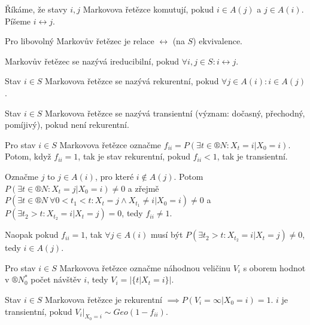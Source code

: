 \documentclass[12pt]{article}					%
\begin{document}
\begin{definice}
	Říkáme, že stavy $i, j$ Markovova řetězce komutují, pokud $i \in A(j)$ a $j \in A(i)$. Píšeme $i \leftrightarrow j$.
\end{definice}

\begin{veta}
	Pro libovolný Markovův řetězec je relace $\leftrightarrow$ (na $S$) ekvivalence.
\end{veta}

\begin{definice}
	Markovův řetězec se nazývá ireducibilní, pokud $\forall i, j \in S: i \leftrightarrow j$.
\end{definice}

\begin{definice}
	Stav $i \in S$ Markovova řetězce se nazývá rekurentní, pokud $\forall j \in A(i): i \in A(j)$.
\end{definice}

\begin{definice}
	Stav $i \in S$ Markovova řetězce se nazývá transientní (význam: dočasný, přechodný, pomíjivý), pokud není rekurentní.
\end{definice}

\begin{veta}
	Pro stav $i \in S$ Markovova řetězce označme $f_{ii} = P(\exists t \in ®N: X_t = i | X_0 = i)$. Potom, když $f_{ii} = 1$, tak je stav rekurentní, pokud $f_{ii} < 1$, tak je transientní.

	\begin{dukazin}
		Označme $j$ to $j \in A(i)$, pro které $i \notin A(j)$. Potom $P(\exists t \in ®N: X_t = j|X_0 = i) ≠ 0$ a zřejmě $P(\exists t \in ®N\ \forall 0 < t_1 < t: X_t = j \land X_{t_1} ≠ i | X_0 = i) ≠ 0$ a $P(\exists t_2 > t: X_{t_2} = i | X_t = j) = 0$, tedy $f_{ii} ≠ 1$.

		Naopak pokud $f_{ii} = 1$, tak $\forall j \in A(i)$ musí být $P(\exists t_2 > t: X_{t_2} = i | X_t = j) ≠ 0$, tedy $i \in A(j)$.
	\end{dukazin}
\end{veta}

\begin{definice}
	Pro stav $i \in S$ Markovova řetězce označme náhodnou veličinu $V_i$ s oborem hodnot v $®N_0^*$ počet návštěv $i$, tedy $V_i = |\{t | X_t = i\}|$.
\end{definice}

\begin{veta}
	Stav $i \in S$ Markovova řetězce je rekurentní $\implies P(V_i = ∞ | X_0 = i) = 1$. $i$ je transientní, pokud $V_i|_{X_0 = i} \sim Geo(1 - f_{ii})$.
\end{veta}
\end{document}
